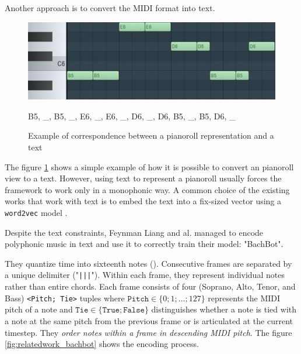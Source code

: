 \documentclass[12pt]{report}
\begin{document}
Another approach is to convert the MIDI format into text. \cite{hadjeres_deepbach:_2016}

\begin{figure}[H]
   \begin{minipage}{0.5\textwidth}
     \centering
     \includegraphics[width=.9\linewidth]{images/music/pianoroll/pianoroll_small_2.jpg}
   \end{minipage}\hfill
   \begin{minipage}{0.5\textwidth}
     \centering
     B5, \_, B5, \_, E6, \_, E6, \_, D6, \_, D6, B5, \_, B5, D6, \_ 
   \end{minipage}
 \caption{Example of correspondence between a pianoroll representation and a text}
 \label{fig:pianoroll_to_text}
\end{figure}

The figure \ref{fig:pianoroll_to_text} shows a simple example of how it is possible to convert an pianoroll view to a text.
However, using text to represent a pianoroll usually forces the framework to work only in a monophonic way.
A common choice of the existing works that work with text is to embed the text into a fix-sized vector using a \texttt{word2vec} \cite{goldberg_word2vec_2014, karani_introduction_2018, rong_word2vec_2016, noauthor_beginners_nodate, mikolov_distributed_2013} model \cite{liang_automatic_2017, herremans_modeling_2017}.

\bigskip

Despite the text constraints, Feynman Liang and al. \cite{liang_automatic_2017} managed to encode polyphonic music in text and use it to correctly train their model: "BachBot".

They quantize time into sixteenth notes (\musEighth). Consecutive frames are separated by a unique delimiter ("\texttt{|||}").
Within each frame, they represent individual notes rather than entire chords.
Each frame consists of four (Soprano, Alto, Tenor, and Bass) \texttt{<Pitch; Tie>} tuples where $\texttt{Pitch} \in \{0; 1; \dots ; 127\}$ represents the MIDI pitch of a note and $\texttt{Tie} \in \{\texttt{True}; \texttt{False}\}$ distinguishes whether a note is tied with a note at the same pitch from the
previous frame or is articulated at the current timestep.
They \textit{order notes within a frame in descending MIDI pitch}.
The figure \ref{fig:relatedwork_bachbot} shows the encoding process.
\end{document}
